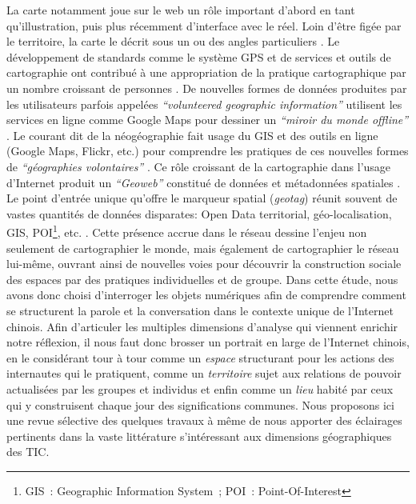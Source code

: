 La carte notamment joue sur le web un rôle important d’abord en tant qu’illustration, puis plus récemment d’interface avec le réel. Loin d’être figée par le territoire, la carte le décrit sous un ou des angles particuliers \citep{Brunet1987, Jacob1992}. Le développement de standards comme le système GPS \citep{Haklay2008} et de services et outils de cartographie ont contribué à une appropriation de la pratique cartographique par un nombre croissant de personnes \citep{Crampton2009}. De nouvelles formes de données produites par les utilisateurs parfois appelées \textit{``volunteered geographic information''} \citep{Elwood2008} utilisent les services en ligne comme Google Maps pour dessiner un \textit{``miroir du monde offline''} \citep{Graham2011}. Le courant dit de la néogéographie fait usage du GIS et des outils en ligne (Google Maps, Flickr, etc.) pour comprendre les pratiques de ces nouvelles formes de \textit{``géographies volontaires''} \citep{Turner2006}. Ce rôle croissant de la cartographie dans l’usage d’Internet produit un \textit{``Geoweb''} constitué de données et métadonnées spatiales \citep{Crampton2009}. Le point d'entrée unique qu'offre le marqueur spatial (\textit{geotag}) réunit souvent de vastes quantités de données disparates: Open Data territorial, géo-localisation, GIS, POI\footnote{GIS : Geographic Information System ; POI : Point-Of-Interest}, etc. \citep{Torrens2010}. Cette présence accrue dans le réseau dessine l’enjeu non seulement de cartographier le monde, mais également de cartographier le réseau lui-même, ouvrant ainsi de nouvelles voies pour découvrir la construction sociale des espaces par des pratiques individuelles et de groupe. Dans cette étude, nous avons donc choisi d’interroger les objets numériques afin de comprendre comment se structurent la parole et la conversation dans le contexte unique de l’Internet chinois. Afin d’articuler les multiples dimensions d’analyse qui viennent enrichir notre réflexion, il nous faut donc brosser un portrait en large de l’Internet chinois, en le considérant tour à tour comme un \textit{espace} structurant pour les actions des internautes qui le pratiquent, comme un \textit{territoire} sujet aux relations de pouvoir actualisées par les groupes et individus et enfin comme un \textit{lieu} habité par ceux qui y construisent chaque jour des significations communes. Nous proposons ici une revue sélective des quelques travaux à même de nous apporter des éclairages pertinents dans la vaste littérature s’intéressant aux dimensions géographiques des TIC.

